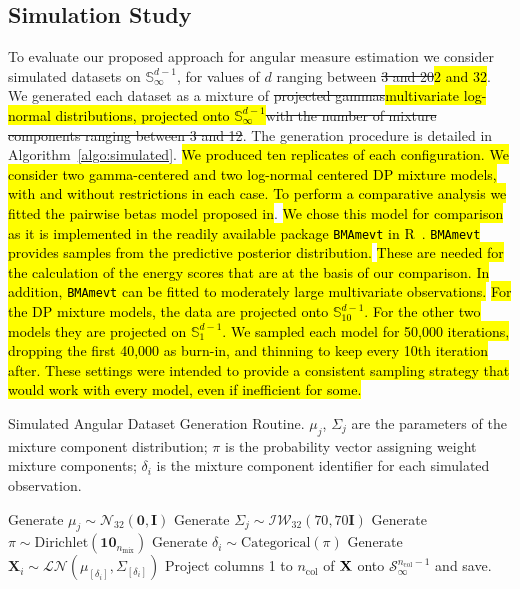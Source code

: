\documentclass[iicol,sn-basic]{sn-jnl}
\theoremstyle{thmstyleone}
\begin{document}
\subsection{Simulation Study\label{subsec:simulated}}
To evaluate our proposed approach for angular measure estimation we consider simulated datasets on $\mathbb{S}_{\infty}^{d-1}$, for values of $d$ ranging between \st{3 and 20}\hl{2 and 32}.  We generated each dataset as a mixture of \st{projected gammas}\hl{multivariate log-normal distributions, projected onto $\mathbb{S}_{\infty}^{d-1}$}\st{with the number of mixture components ranging between 3 and 12}. The generation procedure is detailed in Algorithm~\mbox{\ref{algo:simulated}}. \hl{We produced ten replicates of each configuration. We consider two gamma-centered and two log-normal centered DP mixture models, with and without restrictions in each case. To perform a comparative analysis we fitted the pairwise betas model proposed in\mbox{\cite{COOLEY2010}}}. 
\hl{We chose this model for comparison as it is implemented in the readily available package \mbox{\texttt{BMAmevt}} in R~\mbox{\citep{BMAmevt}}. \mbox{\texttt{BMAmevt}} provides samples from the predictive posterior distribution.}  
\hl{These are needed for the calculation of the energy scores that are at the basis of our comparison. In addition, \mbox{\texttt{BMAmevt}} can be fitted to moderately large multivariate observations.}
\hl{For the DP mixture models, the data are projected onto $\mathbb{S}_{10}^{d-1}$. For the other two models they are projected on $\mathbb{S}_1^{d-1}$.   We sampled each model for 50,000 iterations, dropping the first 40,000 as burn-in, and thinning to keep every 10th iteration after.  These settings were intended to provide a consistent sampling strategy that would work with every model, even if inefficient for some.}

\begin{algorithm}[ht]  %
\caption{Simulated Angular Dataset Generation Routine\label{algo:simulated}.
$\mu_j$, $\Sigma_j$ are the parameters of the mixture component distribution;
$\pi$ is the probability vector assigning weight mixture components; $\delta_i$
is the mixture component identifier for each simulated observation.}
\begin{algorithmic}
\State Generate $\mu_{j} \sim \mathcal{N}_{32}\left(\bm{0},\bm{I}\right)$
\State Generate $\Sigma_{j}\sim\mathcal{IW}_{32}\left(70,70 \bm{I}\right)$
\EndFor
\State Generate $\pi\sim\text{Dirichlet}(\bm{10}_{n_{\text{mix}}})$
\State Generate $\delta_i \sim \text{Categorical}(\pi)$
\State Generate $\bm{X}_i \sim \mathcal{LN}\left(\mu_{[\delta_i]},\Sigma_{[\delta_i]}\right)$
\EndFor
{}
\State Project columns 1 to $n_{\text{col}}$ of ${\bf X}$ onto $\mathcal{S}_{\infty}^{n_{\text{col}} - 1}$ and save.
\EndFor
\EndFor
\EndFor
\end{algorithmic}
\end{algorithm}
\end{document}
